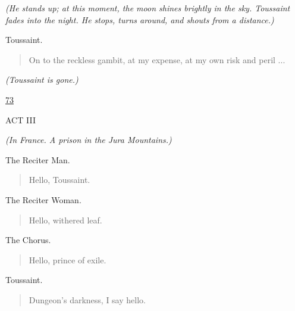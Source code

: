 \documentclass[letterpaper,article,12pt,oneside,notitlepage]{memoir}
\begin{document}
\textit{(He stands up; at this moment, the moon shines brightly in the sky. Toussaint fades into the night. He stops, turns around, and shouts from a distance.)}

\begin{center}Toussaint.\end{center}

\begin{verse}
On to the reckless gambit, at my expense, at my own risk and peril ... \\
\end{verse}

\textit{(Toussaint is gone.)}

\clearpage

\href{http://cesaire.elotroalex.com/chiens/chiens/p073.html}{73}

\begin{center}ACT III\end{center}
\vspace{1cm}

\textit{(In France. A prison in the Jura Mountains.)}

\begin{center}The Reciter Man.\end{center}

\begin{verse}
Hello, Toussaint. \\
\end{verse}

\begin{center}The Reciter Woman.\end{center}

\begin{verse}
Hello, withered leaf. \\
\end{verse}

\begin{center}The Chorus.\end{center}

\begin{verse}
Hello, prince of exile. \\
\end{verse}

\begin{center}Toussaint.\end{center}

\begin{verse}
Dungeon's darkness, I say hello. \\
\end{verse}
\end{document}
